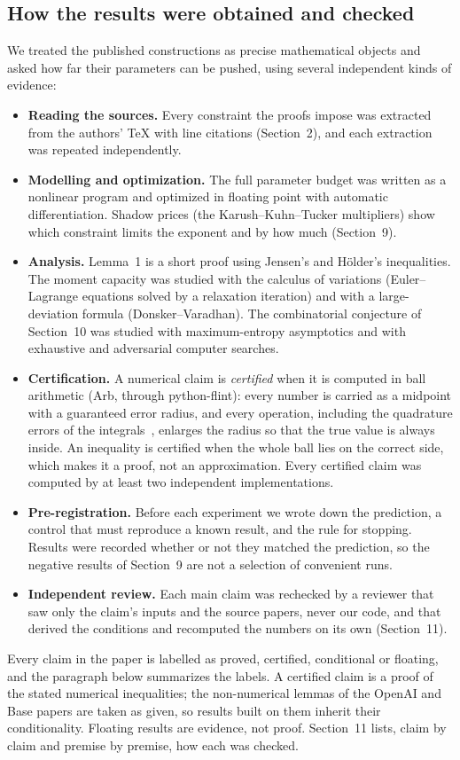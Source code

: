 \documentclass[11pt]{article}
\theoremstyle{plain}
\begin{document}
\subsection*{How the results were obtained and checked}
We treated the published constructions as precise mathematical objects and asked how far their parameters can be pushed, using several independent kinds of evidence:
\begin{itemize}
\item \textbf{Reading the sources.} Every constraint the proofs impose was extracted from the authors' \TeX{} with line citations (Section~2), and each extraction was repeated independently.
\item \textbf{Modelling and optimization.} The full parameter budget was written as a nonlinear program and optimized in floating point with automatic differentiation. Shadow prices (the Karush--Kuhn--Tucker multipliers) show which constraint limits the exponent and by how much (Section~9).
\item \textbf{Analysis.} Lemma~1 is a short proof using Jensen's and H\"older's inequalities. The moment capacity was studied with the calculus of variations (Euler--Lagrange equations solved by a relaxation iteration) and with a large-deviation formula (Donsker--Varadhan). The combinatorial conjecture of Section~10 was studied with maximum-entropy asymptotics and with exhaustive and adversarial computer searches.
\item \textbf{Certification.} A numerical claim is \emph{certified} when it is computed in ball arithmetic (Arb, through python-flint): every number is carried as a midpoint with a guaranteed error radius, and every operation, including the quadrature errors of the integrals~\cite{tw}, enlarges the radius so that the true value is always inside. An inequality is certified when the whole ball lies on the correct side, which makes it a proof, not an approximation. Every certified claim was computed by at least two independent implementations.
\item \textbf{Pre-registration.} Before each experiment we wrote down the prediction, a control that must reproduce a known result, and the rule for stopping. Results were recorded whether or not they matched the prediction, so the negative results of Section~9 are not a selection of convenient runs.
\item \textbf{Independent review.} Each main claim was rechecked by a reviewer that saw only the claim's inputs and the source papers, never our code, and that derived the conditions and recomputed the numbers on its own (Section~11).
\end{itemize}
Every claim in the paper is labelled as proved, certified, conditional or floating, and the paragraph below summarizes the labels. A certified claim is a proof of the stated numerical inequalities; the non-numerical lemmas of the OpenAI and Base papers are taken as given, so results built on them inherit their conditionality. Floating results are evidence, not proof. Section~11 lists, claim by claim and premise by premise, how each was checked.
\end{document}

